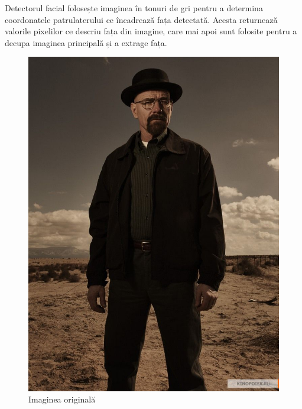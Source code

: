 Detectorul facial folosește imaginea în tonuri de gri pentru a determina coordonatele patrulaterului ce încadrează fața detectată. Acesta returnează valorile pixelilor ce descriu fața din imagine, care mai apoi sunt folosite pentru a decupa imaginea principală și a extrage fața. 

\begin{figure}[htbp]
    \centering
    \begin{minipage}[b]{0.45\textwidth}
        \centering
        \includegraphics[width=\textwidth]{images/WW.jpg}
        \caption{Imaginea originală}
    \end{minipage}
    \hfill
    \begin{minipage}[b]{0.45\textwidth}
        \centering

\end{minipage}
\end{figure}
